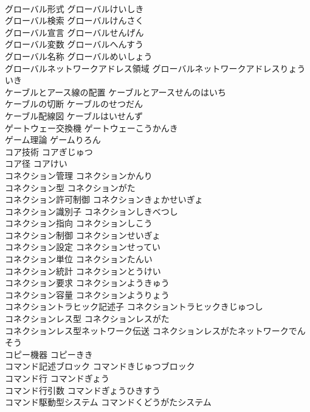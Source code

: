 \documentclass[8pt]{extreport}
\begin{document}
\begin{CJK}{UTF8}{min}
\\	グローバル形式	グローバルけいしき	
\\	グローバル検索	グローバルけんさく	
\\	グローバル宣言	グローバルせんげん	
\\	グローバル変数	グローバルへんすう	
\\	グローバル名称	グローバルめいしょう	
\\	グローバルネットワークアドレス領域	グローバルネットワークアドレスりょういき	
\\	ケーブルとアース線の配置	ケーブルとアースせんのはいち	
\\	ケーブルの切断	ケーブルのせつだん	
\\	ケーブル配線図	ケーブルはいせんず	
\\	ゲートウェー交換機	ゲートウェーこうかんき	
\\	ゲーム理論	ゲームりろん	
\\	コア技術	コアぎじゅつ	
\\	コア径	コアけい	
\\	コネクション管理	コネクションかんり	
\\	コネクション型	コネクションがた	
\\	コネクション許可制御	コネクションきょかせいぎょ	
\\	コネクション識別子	コネクションしきべつし	
\\	コネクション指向	コネクションしこう	
\\	コネクション制御	コネクションせいぎょ	
\\	コネクション設定	コネクションせってい	
\\	コネクション単位	コネクションたんい	
\\	コネクション統計	コネクションとうけい	
\\	コネクション要求	コネクションようきゅう	
\\	コネクション容量	コネクションようりょう	
\\	コネクショントラヒック記述子	コネクショントラヒックきじゅつし	
\\	コネクションレス型	コネクションレスがた	
\\	コネクションレス型ネットワーク伝送	コネクションレスがたネットワークでんそう	
\\	コピー機器	コピーきき	
\\	コマンド記述ブロック	コマンドきじゅつブロック	
\\	コマンド行	コマンドぎょう	
\\	コマンド行引数	コマンドぎょうひきすう	
\\	コマンド駆動型システム	コマンドくどうがたシステム	

\end{CJK}
\end{document}
